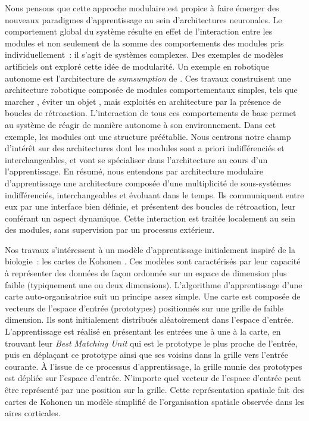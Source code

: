 Nous pensons que cette approche modulaire est propice à faire émerger des nouveaux paradigmes d'apprentissage au sein d'architectures neuronales. 
Le comportement global du système résulte en effet de l'interaction entre les modules et non seulement de la somme des comportements des modules pris individuellement~: il s'agit de systèmes complexes. 
Des exemples de modèles artificiels ont exploré cette idée de modularité. Un exemple en robotique autonome est l'architecture de \emph{sumsumption} de \cite{brooks_sumsumption_85}. Ces travaux construisent une architecture robotique composée de modules comportementaux simples, tels que \og marcher \fg{}, \og éviter un objet \fg{}, mais exploités en architecture par la présence de boucles de rétroaction. 
L'interaction de tous ces comportements de base permet au système de réagir de manière autonome à son environnement. Dans cet exemple, les modules ont une structure préétablie.
Nous centrons notre champ d'intérêt sur des architectures dont les modules sont a priori indifférenciés et interchangeables, et vont se spécialiser dans l'architecture au cours d'un l'apprentissage.
En résumé, nous entendons par architecture modulaire d'apprentissage une architecture composée d'une multiplicité de sous-systèmes indifférenciés, interchangeables et évoluant dans le temps.
Ils communiquent entre eux par une interface bien définie, et présentent des boucles de rétroaction, leur conférant un aspect dynamique. Cette interaction est traitée localement au sein des modules, sans supervision par un processus extérieur.

Nos travaux s'intéressent à un modèle d'apprentissage initialement inspiré de la biologie~: les cartes de Kohonen \parencite{Kohonen1982}.
Ces modèles sont caractérisés par leur capacité à représenter des données de façon ordonnée sur un espace de dimension plus faible (typiquement une ou deux dimensions).
L'algorithme d'apprentissage d'une carte auto-organisatrice suit un principe assez simple. Une carte est composée de vecteurs de l'espace d'entrée (prototypes) positionnés sur une grille de faible dimension.
Ils sont initialement distribués aléatoirement dans l'espace d'entrée. 
L'apprentissage est réalisé en présentant les entrées une à une à la carte, en trouvant leur \emph{Best Matching Unit} qui est le prototype le plus proche de l'entrée, puis en déplaçant ce prototype ainsi que ses voisins dans la grille vers l'entrée courante.
\`A l'issue de ce processus d'apprentissage, la grille munie des prototypes est dépliée sur l'espace d'entrée. N'importe quel vecteur de l'espace d'entrée peut être représenté par une position sur la grille.
Cette représentation spatiale fait des cartes de Kohonen un modèle simplifié de l'organisation spatiale observée dans les aires corticales.

